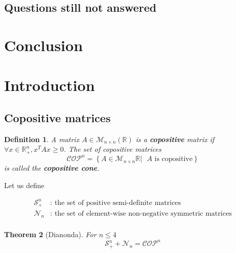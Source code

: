 \documentclass[onecolumn,11pt,a4paper]{article}
\theoremstyle{plain}  %
\newtheorem{theorem}{Theorem}[section]
\newtheorem{defn}[theorem]{Definition}
\theoremstyle{remark}  %
\begin{document}
\subsection{Questions still not answered}
\label{sub:questions}
\section{Conclusion}
\appendix
\newpage
\normalsize
\section{Introduction}
\label{sec:introduction}
\subsection{Copositive matrices}

\begin{defn}
	A matrix $A \in \mathcal{M}_{n \times n} \left( \mathbb{R} \right)$ is a \textbf{copositive} matrix if
	$\forall x \in \mathbb{R}_+^n, x^T A x \ge 0$. The set of copositive matrices
	\[ \mathcal{COP}^n = \left\{ A \in \mathcal{M}_{n \times n} \mathbb{R} |
	\text{ $A$ is
		copositive}\right\} \]
	 is called the \textbf{copositive cone}.
\end{defn}

Let us define 

\begin{align*}
	\mathcal{S}_+^n & : \text{ the set of positive semi-definite matrices} \\
	\mathcal{N}_n  & : \text{ the set of element-wise non-negative symmetric matrices} \\
	\label{}
\end{align*}

\begin{theorem}[Dianonda]
	For $n \le 4$ 
	\[
		 \mathcal{S}_+^n + \mathcal{N}_n =  \mathcal{COP}^n
	\]
\end{theorem}
\end{document}
